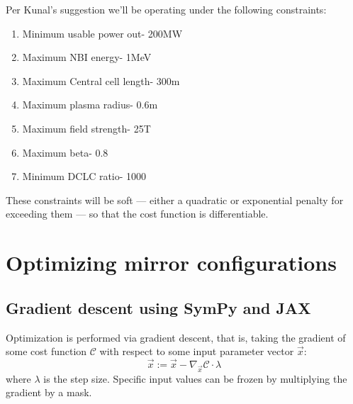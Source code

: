 
Per Kunal's suggestion we'll be operating under the following constraints:
\begin{enumerate}
    \item Minimum usable power out- 200MW
    \item Maximum NBI energy- 1MeV
    \item Maximum Central cell length- 300m
    \item Maximum plasma radius- 0.6m
    \item Maximum field strength- 25T
    \item Maximum beta- 0.8
    \item Minimum DCLC ratio- 1000
\end{enumerate}

These constraints will be soft — either a quadratic or exponential penalty for exceeding them — so that the cost function is differentiable.

\section{Optimizing mirror configurations}

\subsection{Gradient descent using SymPy and JAX}

Optimization is performed via gradient descent, that is, taking the gradient of some cost function $\mathcal{C}$ with respect to some input parameter vector $\vec{x}$:
\begin{equation}
   \vec{x} := \vec{x} - \nabla_{\vec{x}}\mathcal{C} \cdot \lambda
\end{equation}
where $\lambda$ is the step size. Specific input values can be frozen by multiplying the gradient by a mask. 

